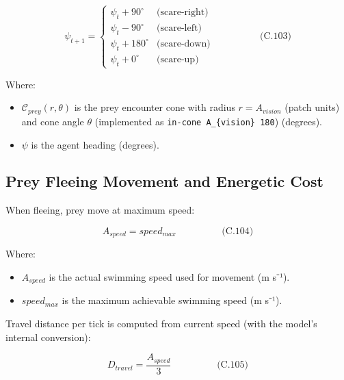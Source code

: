 \documentclass[
]{book}
\providecommand{\tightlist}{%
  \setlength{\itemsep}{0pt}\setlength{\parskip}{0pt}}
\begin{document}
\[
\begin{equation} \psi_{t+1} =
\begin{cases}
\psi_t + 90^\circ  & \text{(scare-right)}\\
\psi_t - 90^\circ  & \text{(scare-left)}\\
\psi_t + 180^\circ & \text{(scare-down)}\\
\psi_t + 0^\circ   & \text{(scare-up)}
\end{cases}  \hspace{2cm} \text{(C.103)} \end{equation}
\]

Where:

\begin{itemize}
\tightlist
\item
  \(\mathcal{C}_{prey}(r,\theta)\) is the prey encounter cone with
  radius \(r = A_{vision}\) (patch units) and cone angle \(\theta\)
  (implemented as \texttt{in-cone\ A\_\{vision\}\ 180}) (degrees).
\item
  \(\psi\) is the agent heading (degrees).
\end{itemize}

\subsection{Prey Fleeing Movement and Energetic Cost}\label{prey-fleeing-movement-and-energetic-cost}

When fleeing, prey move at maximum speed:

\[
\begin{equation} A_{speed} = speed_{max}  \hspace{2cm} \text{(C.104)} \end{equation}
\]

Where:

\begin{itemize}
\tightlist
\item
  \(A_{speed}\) is the actual swimming speed used for movement (m s⁻¹).
\item
  \(speed_{max}\) is the maximum achievable swimming speed (m s⁻¹).
\end{itemize}

Travel distance per tick is computed from current speed (with the
model's internal conversion):

\[
\begin{equation} D_{travel} = \frac{A_{speed}}{3}  \hspace{2cm} \text{(C.105)} \end{equation}
\]
\end{document}
